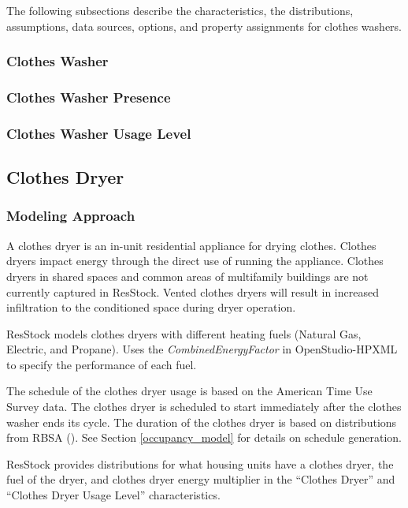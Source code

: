 The following subsections describe the characteristics, the distributions, assumptions, data sources, options, and property assignments for clothes washers.

\subsubsection{Clothes Washer}


\subsubsection{Clothes Washer Presence}\label{clothes_washer_presence}


\subsubsection{Clothes Washer Usage Level}\label{clothes_washer_usage_level}


\subsection{Clothes Dryer}
\subsubsection{Modeling Approach}
A clothes dryer is an in-unit residential appliance for drying clothes. Clothes dryers impact energy through the direct use of running the appliance. Clothes dryers in shared spaces and common areas of multifamily buildings are not currently captured in ResStock. Vented clothes dryers will result in increased infiltration to the conditioned space during dryer operation.

ResStock models clothes dryers with different heating fuels (Natural Gas, Electric, and Propane). Uses the \textit{CombinedEnergyFactor} in OpenStudio-HPXML to specify the performance of each fuel.

The schedule of the clothes dryer usage is based on the American Time Use Survey data. The clothes dryer is scheduled to start immediately after the clothes washer ends its cycle. The duration of the clothes dryer is based on distributions from RBSA (\cite{RBSA}). See Section \ref{occupancy_model} for details on schedule generation.

ResStock provides distributions for what housing units have a clothes dryer, the fuel of the dryer, and clothes dryer energy multiplier in the “Clothes Dryer” and “Clothes Dryer Usage Level” characteristics.

